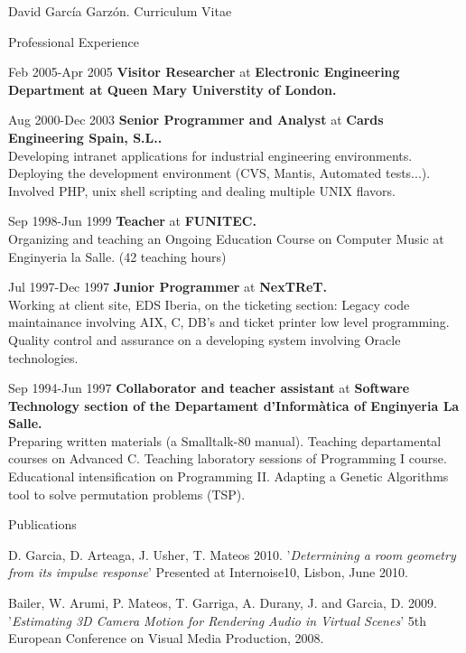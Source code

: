 \documentclass{article}
\begin{document}
\begin{cv}{David García Garzón. Curriculum Vitae}
\begin{cvlist}{Professional Experience}
\item[Feb 2005-Apr 2005]
{\bf Visitor Researcher} at
{\bf Electronic Engineering Department at Queen Mary Universtity of London.}\\


\item[Aug 2000-Dec 2003]
{\bf Senior Programmer and Analyst} at
{\bf Cards Engineering Spain, S.L..}\\
Developing intranet applications for industrial engineering environments. Deploying the development environment (CVS, Mantis, Automated tests...). Involved PHP, unix shell scripting and dealing multiple UNIX flavors.

\item[Sep 1998-Jun 1999]
{\bf Teacher} at
{\bf FUNITEC.}\\
Organizing and teaching an Ongoing Education Course on Computer Music at Enginyeria la Salle. (42 teaching hours)

\item[Jul 1997-Dec 1997]
{\bf Junior Programmer} at
{\bf NexTReT.}\\
Working at client site, EDS Iberia, on the ticketing section: Legacy code maintainance involving AIX, C, DB’s and ticket printer low level programming. Quality control and assurance on a developing system involving Oracle technologies.

\item[Sep 1994-Jun 1997]
{\bf Collaborator and teacher assistant} at
{\bf Software Technology section of the Departament d'Informàtica of Enginyeria La Salle.}\\
Preparing written materials (a Smalltalk-80 manual). Teaching departamental courses on Advanced C. Teaching laboratory sessions of Programming I course. Educational intensification on Programming II. Adapting a Genetic Algorithms tool to solve permutation problems (TSP). 
	
\end{cvlist}

\begin{cvlist}{Publications}

\item[] {\sc D. Garcia, D. Arteaga,  J.  Usher, T. Mateos} 2010.
'{\em Determining a room geometry from its impulse response}'
Presented at Internoise10, Lisbon, June 2010.

\item[] {\sc Bailer, W. Arumi, P. Mateos, T. Garriga, A. Durany, J. and Garcia, D.} 2009.
'{\em Estimating 3D Camera Motion for Rendering Audio in Virtual Scenes}'
5th European Conference on Visual Media Production, 2008.


\end{cvlist}
\end{cv}
\end{document}
